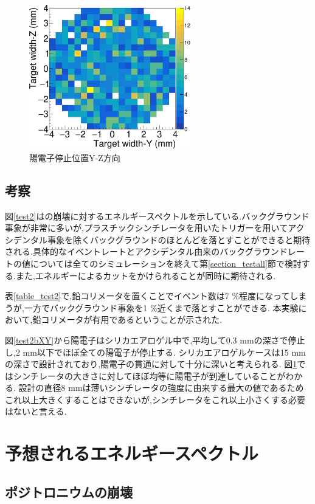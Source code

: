 \begin{figure}[htbp]
	\centering
		\includegraphics[width=7cm]{fig/test2bYZ.pdf}
	\caption{陽電子停止位置Y-Z方向}
	\label{test2bYZ}
\end{figure}

\subsection{考察}

図\ref{test2}はの崩壊に対するエネルギースペクトルを示している.バックグラウンド事象が非常に多いが,プラスチックシンチレータを用いたトリガーを用いてアクシデンタル事象を除くバックグラウンドのほとんどを落とすことができると期待される.具体的なイベントレートとアクシデンタル由来のバックグラウンドレートの値については全てのシミュレーションを終えて第\ref{section_testall}節で検討する.また,エネルギーによるカットをかけられることが同時に期待される.

表\ref{table_test2}で,鉛コリメータを置くことでイベント数は7 \%程度になってしまうが,一方でバックグラウンド事象を1 \%近くまで落とすことができる.
本実験において,鉛コリメータが有用であるということが示された.

図\ref{test2bXY}から陽電子はシリカエアロゲル中で,平均して0.3 mmの深さで停止し,2 mm以下でほぼ全ての陽電子が停止する.
シリカエアロゲルケースは15 mmの深さで設計されており,陽電子の貫通に対して十分に深いと考えられる.
図\ref{test2bYZ}ではシンチレータの大きさに対してほぼ均等に陽電子が到達していることがわかる.
設計の直径8 mmは薄いシンチレータの強度に由来する最大の値であるためこれ以上大きくすることはできないが,シンチレータをこれ以上小さくする必要はないと言える.


\section{予想されるエネルギースペクトル}
\label{section_test3}

\subsection{ポジトロニウムの崩壊}

